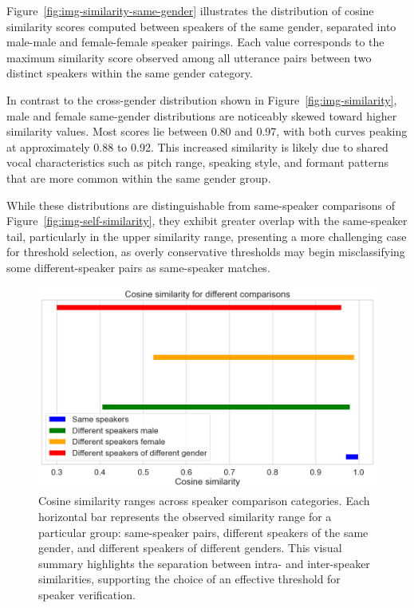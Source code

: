 \documentclass[conference]{IEEEtran}
\begin{document}
	Figure~\ref{fig:img-similarity-same-gender} illustrates the distribution of cosine similarity scores computed between speakers of the same gender, separated into male-male and female-female speaker pairings. Each value corresponds to the maximum similarity score observed among all utterance pairs between two distinct speakers within the same gender category.
	
	In contrast to the cross-gender distribution shown in Figure~\ref{fig:img-similarity}, male and female same-gender distributions are noticeably skewed toward higher similarity values. Most scores lie between 0.80 and 0.97, with both curves peaking at approximately 0.88 to 0.92. This increased similarity is likely due to shared vocal characteristics such as pitch range, speaking style, and formant patterns that are more common within the same gender group.
	
	While these distributions are distinguishable from same-speaker comparisons of Figure~\ref{fig:img-self-similarity}, they exhibit greater overlap with the same-speaker tail, particularly in the upper similarity range, presenting a more challenging case for threshold selection, as overly conservative thresholds may begin misclassifying some different-speaker pairs as same-speaker matches.
	
	\begin{figure}[H]
		\centering
		\includegraphics[width=0.7\linewidth]{img/img-similarity-comparison}
		\caption{Cosine similarity ranges across speaker comparison categories. Each horizontal bar represents the observed similarity range for a particular group: same-speaker pairs, different speakers of the same gender, and different speakers of different genders. This visual summary highlights the separation between intra- and inter-speaker similarities, supporting the choice of an effective threshold for speaker verification.}
		\label{fig:img-similarity-comparison}
	\end{figure}
	
\end{document}
